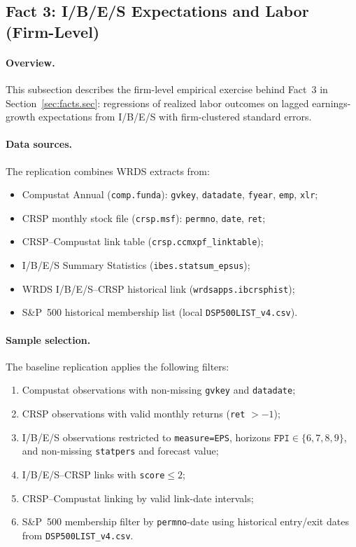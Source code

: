 \subsection{Fact 3: I/B/E/S Expectations and Labor (Firm-Level)}\label{app:data_fact3_expectations_labor}

\paragraph{Overview.}
This subsection describes the firm-level empirical exercise behind Fact~3 in Section~\ref{sec:facts.sec}: regressions of realized labor outcomes on lagged earnings-growth expectations from I/B/E/S with firm-clustered standard errors.

\paragraph{Data sources.}
The replication combines WRDS extracts from:
\begin{itemize}
\item Compustat Annual (\texttt{comp.funda}): \texttt{gvkey}, \texttt{datadate}, \texttt{fyear}, \texttt{emp}, \texttt{xlr};
\item CRSP monthly stock file (\texttt{crsp.msf}): \texttt{permno}, \texttt{date}, \texttt{ret};
\item CRSP--Compustat link table (\texttt{crsp.ccmxpf\_linktable});
\item I/B/E/S Summary Statistics (\texttt{ibes.statsum\_epsus});
\item WRDS I/B/E/S--CRSP historical link (\texttt{wrdsapps.ibcrsphist});
\item S\&P~500 historical membership list (local \texttt{DSP500LIST\_v4.csv}).
\end{itemize}

\paragraph{Sample selection.}
The baseline replication applies the following filters:
\begin{enumerate}
\item Compustat observations with non-missing \texttt{gvkey} and \texttt{datadate};
\item CRSP observations with valid monthly returns (\texttt{ret} $>-1$);
\item I/B/E/S observations restricted to \texttt{measure=EPS}, horizons \(\texttt{FPI}\in\{6,7,8,9\}\), and non-missing \texttt{statpers} and forecast value;
\item I/B/E/S--CRSP links with \texttt{score}\(\le 2\);
\item CRSP--Compustat linking by valid link-date intervals;
\item S\&P~500 membership filter by \texttt{permno}-date using historical entry/exit dates from \texttt{DSP500LIST\_v4.csv}.
\end{enumerate}

